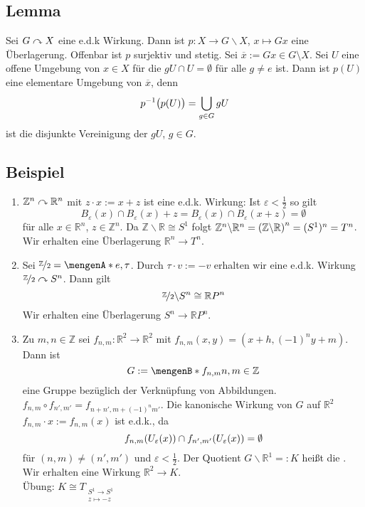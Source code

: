 \subsection{Lemma} %
\label{sub:12.2}
Sei $G \wirkung X$ eine e.d.k Wirkung. Dann ist $p : X \to G \backslash X$, $x \mapsto Gx$ eine Überlagerung.
Offenbar ist $p$ surjektiv und stetig. Sei $\overline{x} := G x \in G \setminus X $. Sei $U$ eine offene Umgebung von $x \in X$ für die $g U \cap U = \emptyset$ für alle $g \not= e$ ist. Dann ist $p(U)$ eine elementare Umgebung von $\overline{x}$, denn 
\[
	p ^{-1} \enbrace[\big]{p(U)} = \bigcup_{g \in G} g U
\]
ist die disjunkte Vereinigung der $g U$, $g \in G$. \bewende

\subsection{Beispiel} %
\label{sub:12.3}
\begin{enumerate}[(1)]
	\item $\mathds{Z}^n \wirkung \mathds{R}^n$ mit $z \cdot x := x + z$ ist eine e.d.k. Wirkung: Ist $\varepsilon < \frac{1}{2}$ so gilt 
	\[
		B_\varepsilon(x) \cap B_\varepsilon(x) + z = B_\varepsilon(x) \cap B_\varepsilon(x +z) = \emptyset
	\]
	für alle $x \in \mathds{R}^n$, $z \in \mathds{Z}^n$. Da $\mathds{Z} \backslash \mathds{R} \cong S^1$ folgt 
	$\mathds{Z}^n \backslash \mathds{R}^n = \enbrace*{\mathds{Z} \backslash \mathds{R}}^n = (S^1)^n = T^n $. Wir erhalten eine Überlagerung $\mathds{R}^n \to T^n$.
	\item Sei $\nicefrac{\mathds{Z}}{2} = \set{e, \tau}$. Durch $\tau \cdot v := - v$ erhalten wir eine e.d.k. Wirkung $\nicefrac{\mathds{Z}}{2} \wirkung S^n$. Dann gilt
	\[
		\nicefrac{\mathds{Z}}{2} \backslash S^n \cong \mathds{R}P^n
	\]
	Wir erhalten eine Überlagerung $S^n \to \mathds{R}P^n$. 
	\item Zu $m,n \in \mathds{Z}$ sei $f_{n,m} : \mathds{R}^2 \to \mathds{R}^2$ mit $f_{n,m} (x,y) = (x+ h, (-1)^n y + m)$. Dann ist 
	\[
		G := \set[f_{n,m}]{n,m \in \mathds{Z}} 
	\]
	eine Gruppe bezüglich der Verknüpfung von Abbildungen. $f_{n,m} \circ f_{n',m'} = f_{n+n', m+ (-1)^n m'}$. Die kanonische Wirkung von $G$ auf $\mathds{R}^2$ 
	$f_{n,m} \cdot x := f_{n,m}(x)$ ist e.d.k., da 
	\[
		f_{n,m} \enbrace*{U_\varepsilon(x)} \cap f_{n',m'} \enbrace*{U_\varepsilon(x)} = \emptyset  
	\]
	für $(n,m) \not= (n',m')$ und $\varepsilon < \frac{1}{2}$. Der Quotient $G\backslash \mathds{R}^1 =: K$ heißt die . Wir erhalten eine Wirkung
	$\mathds{R}^2 \to K$. \\
	Übung: $K \cong T_{\substack{S^1 \to S^1 \\ z \mapsto -z}}$ 
\end{enumerate}

